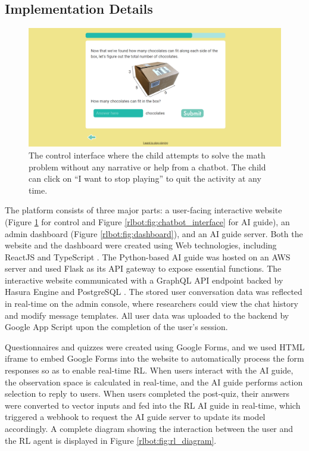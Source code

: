 \documentclass[sn-mathphys,Numbered]{sn-jnl}%
\theoremstyle{thmstyleone}%
\theoremstyle{thmstyletwo}%
\theoremstyle{thmstylethree}%
\begin{document}
\begin{appendices}
\subsection*{Implementation Details}

\begin{figure}[!th]%
    \centering
    \includegraphics[width=0.9\linewidth]{Figures/control.png} 
    \caption{The control interface where the child attempts to solve the math problem without any narrative or help from a chatbot. The child can click on ``I want to stop playing'' to quit the activity at any time.}
    \label{rlbot:fig:control_interface}
\end{figure}

The platform consists of three major parts: a user-facing interactive website (Figure \ref{rlbot:fig:control_interface} for control and Figure \ref{rlbot:fig:chatbot_interface} for AI guide), an admin dashboard (Figure \ref{rlbot:fig:dashboard}), and an AI guide server. Both the website and the dashboard were created using Web technologies, including ReactJS \cite{react} and TypeScript \cite{typescript}. The Python-based AI guide was hosted on an AWS server and used Flask \cite{flask} as its API gateway to expose essential functions. The interactive website communicated with a GraphQL \cite{graphql} API endpoint backed by Hasura Engine \cite{graphql} and PostgreSQL \cite{postgres}. The stored user conversation data was reflected in real-time on the admin console, where researchers could view the chat history and modify message templates. All user data was uploaded to the backend by Google App Script upon the completion of the user's session. 

Questionnaires and quizzes were created using Google Forms, and we used HTML iframe to embed Google Forms into the website to automatically process the form responses so as to enable real-time RL. When users interact with the AI guide, the observation space is calculated in real-time, and the AI guide performs action selection to reply to users. When users completed the post-quiz, their answers were converted to vector inputs and fed into the RL AI guide in real-time, which triggered a webhook to request the AI guide server to update its model accordingly. A complete diagram showing the interaction between the user and the RL agent is displayed in Figure \ref{rlbot:fig:rl_diagram}.













\end{appendices}
\end{document}
